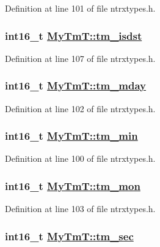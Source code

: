 Definition at line 101 of file ntrxtypes.h.\hypertarget{structMyTmT_0401d4746fa48608fe3466d5bc5f9fee}{
\subsubsection[tm\_\-isdst]{\setlength{\rightskip}{0pt plus 5cm}int16\_\-t \hyperlink{structMyTmT_0401d4746fa48608fe3466d5bc5f9fee}{My\-Tm\-T::tm\_\-isdst}}}
\label{structMyTmT_0401d4746fa48608fe3466d5bc5f9fee}




Definition at line 107 of file ntrxtypes.h.\hypertarget{structMyTmT_7cc2f1da8cb1ebf0dfcdea2f3c07f85a}{
\subsubsection[tm\_\-mday]{\setlength{\rightskip}{0pt plus 5cm}int16\_\-t \hyperlink{structMyTmT_7cc2f1da8cb1ebf0dfcdea2f3c07f85a}{My\-Tm\-T::tm\_\-mday}}}
\label{structMyTmT_7cc2f1da8cb1ebf0dfcdea2f3c07f85a}




Definition at line 102 of file ntrxtypes.h.\hypertarget{structMyTmT_fb56232ae9856cbf577da4e60a8fc551}{
\subsubsection[tm\_\-min]{\setlength{\rightskip}{0pt plus 5cm}int16\_\-t \hyperlink{structMyTmT_fb56232ae9856cbf577da4e60a8fc551}{My\-Tm\-T::tm\_\-min}}}
\label{structMyTmT_fb56232ae9856cbf577da4e60a8fc551}




Definition at line 100 of file ntrxtypes.h.\hypertarget{structMyTmT_c565f90f9f1a8b1679f6e614e2138170}{
\subsubsection[tm\_\-mon]{\setlength{\rightskip}{0pt plus 5cm}int16\_\-t \hyperlink{structMyTmT_c565f90f9f1a8b1679f6e614e2138170}{My\-Tm\-T::tm\_\-mon}}}
\label{structMyTmT_c565f90f9f1a8b1679f6e614e2138170}




Definition at line 103 of file ntrxtypes.h.\hypertarget{structMyTmT_136d95defb2f233df5af719b09e7eea7}{
\subsubsection[tm\_\-sec]{\setlength{\rightskip}{0pt plus 5cm}int16\_\-t \hyperlink{structMyTmT_136d95defb2f233df5af719b09e7eea7}{My\-Tm\-T::tm\_\-sec}}}
\label{structMyTmT_136d95defb2f233df5af719b09e7eea7}




